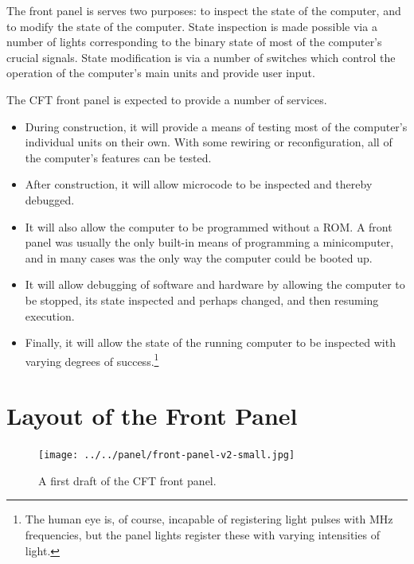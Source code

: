 \documentclass[11pt,a4paper,twocolumns]{article}
\begin{document}
The front panel is serves two purposes: to inspect the state of the
computer, and to modify the state of the computer. State inspection is
made possible via a number of lights corresponding to the binary state
of most of the computer's crucial signals. State modification is via a
number of switches which control the operation of the computer's main
units and provide user input.

The CFT front panel is expected to provide a number of services.

\begin{itemize}
\item During construction, it will provide a means of testing most of
  the computer's individual units on their own. With some rewiring or
  reconfiguration, all of the computer's features can be tested.

\item After construction, it will allow microcode to be inspected and
  thereby debugged.

\item It will also allow the computer to be programmed without a
  ROM. A front panel was usually the only built-in means of
  programming a minicomputer, and in many cases was the only way the
  computer could be booted up.

\item It will allow debugging of software and hardware by allowing the
  computer to be stopped, its state inspected and perhaps changed, and
  then resuming execution.

\item Finally, it will allow the state of the running computer to be
  inspected with varying degrees of success.\footnote{The human eye
    is, of course, incapable of registering light pulses with MHz
    frequencies, but the panel lights register these with varying
    intensities of light.}

\end{itemize}

\section{Layout of the Front Panel}

\begin{figure}[t]
\centering
\texttt{[image: ../../panel/front-panel-v2-small.jpg]}\\
\caption{\label{fig-panel}A first draft of the CFT front panel.}
\end{figure}
\end{document}
